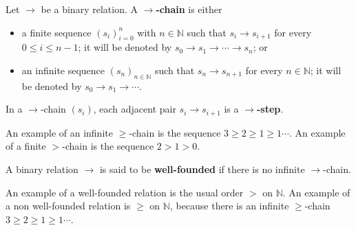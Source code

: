 \begin{definition}
    \label{def:binary_relation:chain} 
    Let \(\to\) be a binary relation. 
    A \textbf{\(\to\)-chain} is either
      \begin{itemize}
          \item a finite sequence \((s_i)_{i=0}^n\) with \(n \in \mathbb{N}\) such that \(s_i \to s_{i+1}\) for every \(0 \leq i \leq n-1\); it will be denoted by \(s_0 \to s_1 \to \cdots \to s_n\); or
          \item an infinite sequence \((s_n)_{n \in \mathbb{N}}\) such that \(s_n \to s_{n+1}\) for every \(n \in \mathbb{N}\); it will be denoted by \(s_0 \to s_1 \to \cdots\).
      \end{itemize}
      In a \(\to\)-chain \((s_i)\), each adjacent pair \(s_i \to s_{i+1}\) is a \textbf{\(\to\)-step}.
\end{definition}
An example of an infinite \(\geq\)-chain is the sequence \(3 \geq 2 \geq 1 \geq 1 \cdots\). An example of a finite \(>\)-chain is the sequence \(2 > 1 > 0\).
\begin{definition} 
    \label{def:binary_relation:well_founded}
    A binary relation $\to$ is said to be \textbf{well-founded} if there is no infinite $\to$-chain. 
\end{definition}
An example of a well-founded relation is the usual order
\(>\) on \(\mathbb{N}\). An example of a non well-founded relation is \(\geq\) on \(\mathbb{N}\), because there is an infinite \(\geq\)-chain \(3 \geq 2 \geq 1 \geq 1 \cdots\).